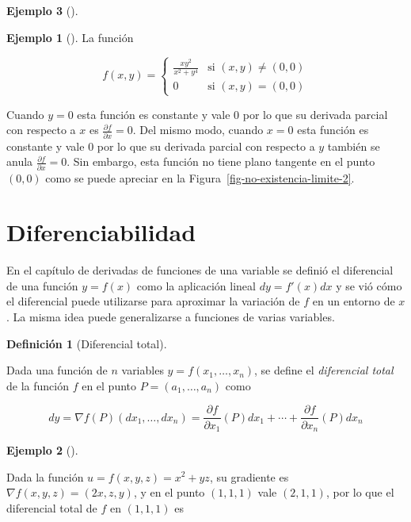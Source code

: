 \documentclass[
  a4paper,
]{scrreport}
\theoremstyle{definition}
\newtheorem{example}{Ejemplo}[chapter]
\theoremstyle{plain}
\theoremstyle{definition}
\newtheorem{definition}{Definición}[chapter]
\theoremstyle{definition}
\theoremstyle{plain}
\theoremstyle{plain}
\theoremstyle{remark}
\begin{document}
\begin{example}[]
\begin{example}[]
La función

\[
f(x,y) = 
\begin{cases}
\frac{xy^2}{x^2+y^4} & \mbox{si $(x,y)\neq (0,0)$}\\
0  & \mbox{si $(x,y) = (0,0)$}
\end{cases}
\]

Cuando \(y=0\) esta función es constante y vale \(0\) por lo que su
derivada parcial con respecto a \(x\) es
\(\frac{\partial f}{\partial x} = 0\). Del mismo modo, cuando \(x=0\)
esta función es constante y vale \(0\) por lo que su derivada parcial
con respecto a \(y\) también se anula
\(\frac{\partial f}{\partial x} = 0\). Sin embargo, esta función no
tiene plano tangente en el punto \((0,0)\) como se puede apreciar en la
Figura~\ref{fig-no-existencia-limite-2}.

\end{example}

\section{Diferenciabilidad}\label{diferenciabilidad-1}

En el capítulo de derivadas de funciones de una variable se definió el
diferencial de una función \(y=f(x)\) como la aplicación lineal
\(dy = f'(x)dx\) y se vió cómo el diferencial puede utilizarse para
aproximar la variación de \(f\) en un entorno de \(x\). La misma idea
puede generalizarse a funciones de varias variables.

\begin{definition}[Diferencial
total]\protect\hypertarget{def-diferencial-total}{}\label{def-diferencial-total}

Dada una función de \(n\) variables \(y=f(x_1,\ldots,x_n)\), se define
el \emph{diferencial total} de la función \(f\) en el punto
\(P=(a_1, \ldots, a_n)\) como

\[
dy 
= \nabla f(P)(dx_1, \ldots, dx_n) 
= \frac{\partial f}{\partial x_1}(P)dx_1 + \cdots + \frac{\partial f}{\partial x_n}(P)dx_n
\]

\end{definition}

\begin{example}[]\protect\hypertarget{exm-diferencial-total}{}\label{exm-diferencial-total}

Dada la función \(u=f(x,y,z) = x^2+yz\), su gradiente es
\(\nabla f(x,y,z) = (2x, z, y)\), y en el punto \((1, 1, 1)\) vale
\((2, 1, 1)\), por lo que el diferencial total de \(f\) en \((1, 1, 1)\)
es


\end{example}
\end{example}
\end{document}
